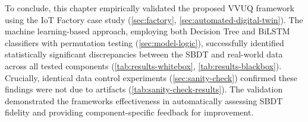 To conclude, this chapter empirically validated the proposed VVUQ framework using the IoT Factory case study (\autoref{sec:factory}, \autoref{sec:automated-digital-twin}). The machine learning-based approach, employing both Decision Tree and BiLSTM classifiers with permutation testing (\autoref{sec:model-logic}), successfully identified statistically significant discrepancies between the SBDT and real-world data across all tested components (\autoref{tab:results-whitebox}, \autoref{tab:results-blackbox}). Crucially, identical data control experiments (\autoref{sec:sanity-check}) confirmed these findings were not due to artifacts (\autoref{tab:sanity-check-results}). The validation demonstrated the frameworks effectiveness in automatically assessing SBDT fidelity and providing component-specific feedback for improvement.